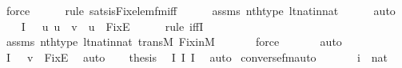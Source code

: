 \begin{isabellebody}
\ force\ \isanewline
\ \ \ \ \isamarkupfalse%
{\isacharparenleft}{\kern0pt}rule\ sats{\isacharunderscore}{\kern0pt}is{\isacharunderscore}{\kern0pt}Fix{\isacharunderscore}{\kern0pt}elem{\isacharunderscore}{\kern0pt}fm{\isacharunderscore}{\kern0pt}iff{\isacharparenright}{\kern0pt}\isanewline
\ \ \ \ \isamarkupfalse%
\ assms\ nth{\isacharunderscore}{\kern0pt}type\ lt{\isacharunderscore}{\kern0pt}nat{\isacharunderscore}{\kern0pt}in{\isacharunderscore}{\kern0pt}nat\isanewline
\ \ \ \ \isamarkupfalse%
\ auto\isanewline
\ \ \isamarkupfalse%
\ I{}{\isacharcolon}{\kern0pt}\ {\isachardoublequoteopen}{\isachardot}{\kern0pt}{\isachardot}{\kern0pt}{\isachardot}{\kern0pt}\ {\isasymlongleftrightarrow}\ {\isacharparenleft}{\kern0pt}{\isasymforall}u{\isachardot}{\kern0pt}\ u\ {\isasymin}\ v\ {\isasymlongleftrightarrow}\ u\ {\isasymin}\ Fix{\isacharparenleft}{\kern0pt}E{\isacharparenright}{\kern0pt}{\isacharparenright}{\kern0pt}{\isachardoublequoteclose}\ \isanewline
\ \ \ \ \isamarkupfalse%
{\isacharparenleft}{\kern0pt}rule\ iffI{\isacharparenright}{\kern0pt}\isanewline
\ \ \ \ \isamarkupfalse%
\ assms\ nth{\isacharunderscore}{\kern0pt}type\ lt{\isacharunderscore}{\kern0pt}nat{\isacharunderscore}{\kern0pt}in{\isacharunderscore}{\kern0pt}nat\ transM\ Fix{\isacharunderscore}{\kern0pt}in{\isacharunderscore}{\kern0pt}M\isanewline
\ \ \ \ \ \isamarkupfalse%
\ force\ \isanewline
\ \ \ \ \isamarkupfalse%
\ auto\isanewline
\ \ \isamarkupfalse%
\ I{}{\isacharcolon}{\kern0pt}\ {\isachardoublequoteopen}{\isachardot}{\kern0pt}{\isachardot}{\kern0pt}{\isachardot}{\kern0pt}\ {\isasymlongleftrightarrow}\ v\ {\isacharequal}{\kern0pt}\ Fix{\isacharparenleft}{\kern0pt}E{\isacharparenright}{\kern0pt}{\isachardoublequoteclose}\ \isamarkupfalse%
\ auto\isanewline
\ \ \isamarkupfalse%
\ {\isacharquery}{\kern0pt}thesis\ \isamarkupfalse%
\ I{}\ I{}\ I{}\ \isamarkupfalse%
\ auto\isanewline
{}\isamarkupfalse%
%
\endisatagproof
{\isafoldproof}%
%
\isadelimproof
\isanewline
%
\endisadelimproof
\isanewline
\isanewline
{}\isamarkupfalse%
\ converse{\isacharunderscore}{\kern0pt}fm{\isacharunderscore}{\kern0pt}auto{\isacharcolon}{\kern0pt}\isanewline
\ \ \isanewline
\ \ \ \ {\isachardoublequoteopen}i\ {\isasymin}\ nat{\isachardoublequoteclose}\isanewline

\end{isabellebody}
